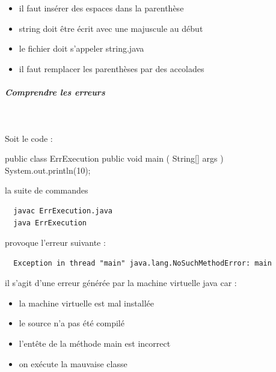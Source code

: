 \documentclass[11pt,a4paper]{article}
\begin{document}
            \begin{itemize} 
        
            \item[ \ding{"6D} ] il faut ins\'erer des espaces dans la parenth\`ese
        
            \item[ \ding{"6D} ] string doit \^etre \'ecrit avec une majuscule au d\'ebut
        
            \item[ \ding{"6D} ] le fichier doit s'appeler string.java
        
            \item[ \ding{"6D} ] il faut remplacer les parenth\`eses par des accolades
        
            \end{itemize} 
        
			
		\subparagraph{Comprendre les erreurs} 
		
                \textcolor{white}{.} \par
            
								Soit le code :
							
            \par
        \begin{Java}
  public class ErrExecution {
      public void main ( String[] args ) {
          System.out.println(10);
      }
  }							\end{Java}
								la suite de commandes 
							
            \par
        \begin{verbatim}
  javac ErrExecution.java 
  java ErrExecution			\end{verbatim}
								provoque l'erreur suivante :
							
            \par
        \begin{verbatim}
  Exception in thread "main" java.lang.NoSuchMethodError: main\end{verbatim}
								il s'agit d'une erreur g\'en\'er\'ee par la machine virtuelle java car :
							
            \par
        
            \begin{itemize} 
        
            \item[ \ding{"6D} ] la machine virtuelle est mal install\'ee
        
            \item[ \ding{"6D} ] le source n'a pas \'et\'e compil\'e
        
            \item[ \ding{"6D} ] l'ent\^ete de la m\'ethode main est incorrect
        
            \item[ \ding{"6D} ] on ex\'ecute la mauvaise classe
        
            \end{itemize} 
        
\end{document}

